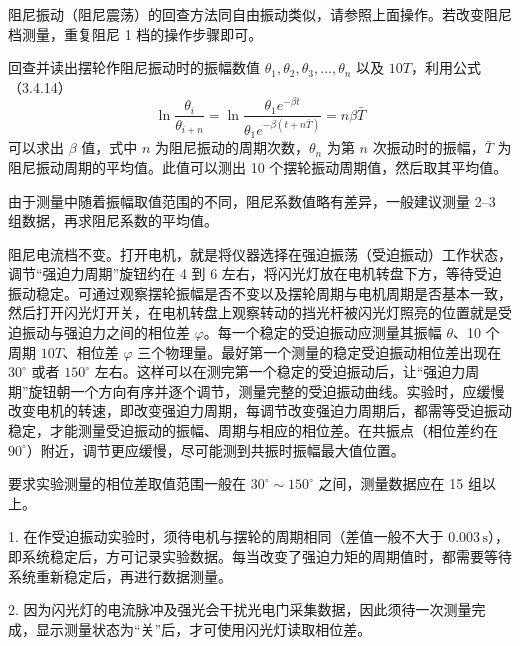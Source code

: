 阻尼振动（阻尼震荡）的回查方法同自由振动类似，请参照上面操作。若改变阻尼档测量，重复阻尼 1 档的操作步骤即可。

回查并读出摆轮作阻尼振动时的振幅数值 $\theta_1,\theta_2,\theta_3,\ldots,\theta_n$ 以及 $10T$，利用公式（3.4.14）
\begin{equation}
\ln\frac{\theta_i}{\theta_{i+n}}
=\ln\frac{\theta_1 e^{-\beta t}}{\theta_1 e^{-\beta(t+n\bar T)}}
=n\beta\bar T
\tag{3.4.14}
\end{equation}
可以求出 $\beta$ 值，式中 $n$ 为阻尼振动的周期次数，$\theta_n$ 为第 $n$ 次振动时的振幅，$\bar T$ 为阻尼振动周期的平均值。此值可以测出 10 个摆轮振动周期值，然后取其平均值。

由于测量中随着振幅取值范围的不同，阻尼系数值略有差异，一般建议测量 2--3 组数据，再求阻尼系数的平均值。

阻尼电流档不变。打开电机，就是将仪器选择在强迫振荡（受迫振动）工作状态，调节“强迫力周期”旋钮约在 4 到 6 左右，将闪光灯放在电机转盘下方，等待受迫振动稳定。可通过观察摆轮振幅是否不变以及摆轮周期与电机周期是否基本一致，然后打开闪光灯开关，在电机转盘上观察转动的挡光杆被闪光灯照亮的位置就是受迫振动与强迫力之间的相位差 $\varphi$。每一个稳定的受迫振动应测量其振幅 $\theta$、10 个周期 $10T$、相位差 $\varphi$ 三个物理量。最好第一个测量的稳定受迫振动相位差出现在 $30^\circ$ 或者 $150^\circ$ 左右。这样可以在测完第一个稳定的受迫振动后，让“强迫力周期”旋钮朝一个方向有序并逐个调节，测量完整的受迫振动曲线。实验时，应缓慢改变电机的转速，即改变强迫力周期，每调节改变强迫力周期后，都需等受迫振动稳定，才能测量受迫振动的振幅、周期与相应的相位差。在共振点（相位差约在 $90^\circ$）附近，调节更应缓慢，尽可能测到共振时振幅最大值位置。

要求实验测量的相位差取值范围一般在 $30^\circ\sim150^\circ$ 之间，测量数据应在 15 组以上。

1. 在作受迫振动实验时，须待电机与摆轮的周期相同（差值一般不大于 $0.003\,\mathrm{s}$），即系统稳定后，方可记录实验数据。每当改变了强迫力矩的周期值时，都需要等待系统重新稳定后，再进行数据测量。\par
2. 因为闪光灯的电流脉冲及强光会干扰光电门采集数据，因此须待一次测量完成，显示测量状态为“关”后，才可使用闪光灯读取相位差。

